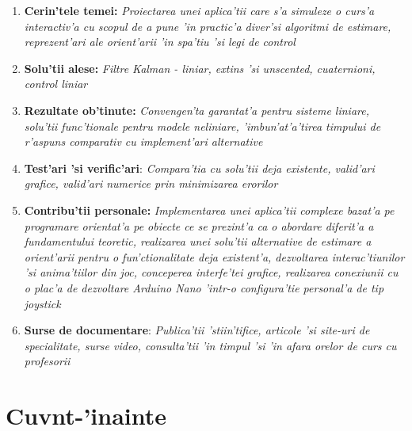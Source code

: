 \documentclass[12pt,a4paper,twoside]{report}
\begin{document}
\begin{enumerate}
 \item {\bf Cerin'tele temei:} {\it Proiectarea unei aplica'tii care s'a simuleze o curs'a interactiv'a cu scopul de a pune 'in practic'a diver'si algoritmi de estimare, reprezent'ari ale orient'arii 'in spa'tiu 'si legi de control}
\item {\bf Solu'tii alese:} {\it Filtre Kalman - liniar, extins 'si unscented, cuaternioni, control liniar}
\item {\bf Rezultate ob'tinute:} {\it Convengen'ta garantat'a pentru sisteme liniare, solu'tii func'tionale pentru modele neliniare, 'imbun'at'a'tirea timpului de r'aspuns comparativ cu implement'ari alternative}
\item {\bf Test'ari 'si verific'ari}: {\it Compara'tia cu solu'tii deja existente, valid'ari grafice, valid'ari numerice prin minimizarea erorilor}
\item {\bf Contribu'tii personale:}  {\it Implementarea unei aplica'tii complexe bazat'a pe programare orientat'a pe obiecte ce se prezint'a ca o abordare diferit'a a fundamentului teoretic, realizarea unei solu'tii alternative de estimare a orient'arii pentru o fun'ctionalitate deja existent'a, dezvoltarea interac'tiunilor 'si anima'tiilor din joc, conceperea interfe'tei grafice, realizarea conexiunii cu o plac'a de dezvoltare Arduino Nano 'intr-o configura'tie personal'a de tip joystick}
\item {\bf Surse de documentare}: {\it Publica'tii 'stiin'tifice, articole 'si site-uri de specialitate, surse video, consulta'tii 'in timpul 'si 'in afara orelor de curs cu profesorii} 
 \end{enumerate}
\vspace{1.2cm}

\thispagestyle{empty}

\newpage


%  

\setcounter{page}{1}

\newpage

\tableofcontents

\newpage


\setcounter{page}{1}

\chapter{Cuv\ia nt-'inainte}
\end{document}

